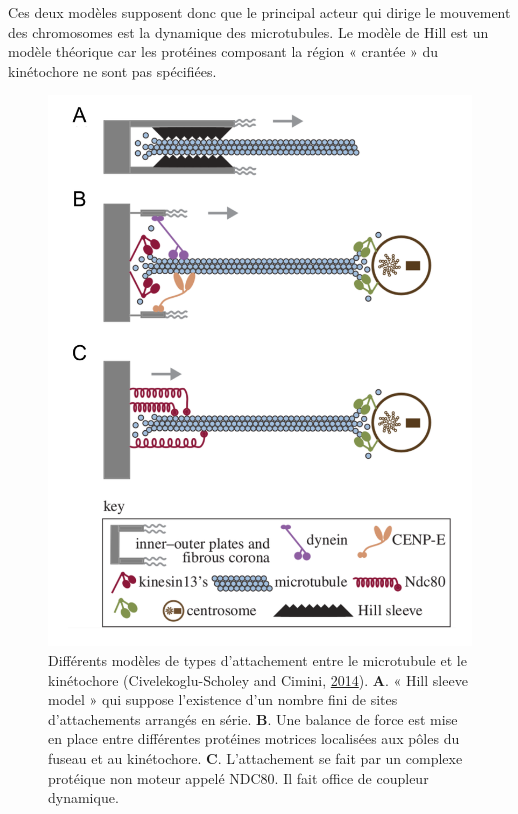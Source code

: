 \documentclass[12pt,a4paper,twoside,openright]{book}
\begin{document}
Ces deux modèles supposent donc que le principal acteur qui dirige le
mouvement des chromosomes est la dynamique des microtubules. Le modèle
de Hill est un modèle théorique car les protéines composant la région «
crantée » du kinétochore ne sont pas spécifiées.

\begin{figure}[htbp]
\centering
\includegraphics{figures/intro/hill_model.png}
\caption[Différents modèles de types d'attachement entre le microtubule et le kinétochore]{\label{fig:hill_model}Différents
modèles de types d'attachement entre le microtubule et le kinétochore
(Civelekoglu-Scholey and Cimini,
\hyperref[ref-Civelekoglu-Scholey2014]{2014}). \textbf{A}. « Hill sleeve
model » qui suppose l'existence d'un nombre fini de sites d'attachements
arrangés en série. \textbf{B}. Une balance de force est mise en place
entre différentes protéines motrices localisées aux pôles du fuseau et
au kinétochore. \textbf{C}. L'attachement se fait par un complexe
protéique non moteur appelé NDC80. Il fait office de coupleur
dynamique.}
\end{figure}
\end{document}

